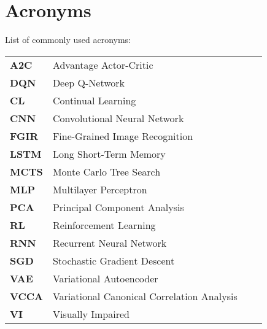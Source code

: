 
\chapter{Acronyms}
\label{chap:acronyms}

List of commonly used acronyms: \\

\begin{tabular}{llll}
	\textbf{A2C}		& 	Advantage Actor-Critic \\
	\textbf{DQN}		& 	Deep Q-Network \\
	\textbf{CL}			& 	Continual Learning \\
	\textbf{CNN}		& 	Convolutional Neural Network \\
	\textbf{FGIR}		& 	Fine-Grained Image Recognition \\
	\textbf{LSTM}       &   Long Short-Term Memory \\
	\textbf{MCTS}       &   Monte Carlo Tree Search \\
	\textbf{MLP}        &   Multilayer Perceptron \\
	\textbf{PCA}		& 	Principal Component Analysis \\
	\textbf{RL}			& 	Reinforcement Learning \\
	\textbf{RNN}		& 	Recurrent Neural Network \\
	\textbf{SGD}		& 	Stochastic Gradient Descent \\
	\textbf{VAE}		&	Variational Autoencoder \\
	\textbf{VCCA}		&	Variational Canonical Correlation Analysis \\
	\textbf{VI} 		&	Visually Impaired \\ %
\end{tabular}